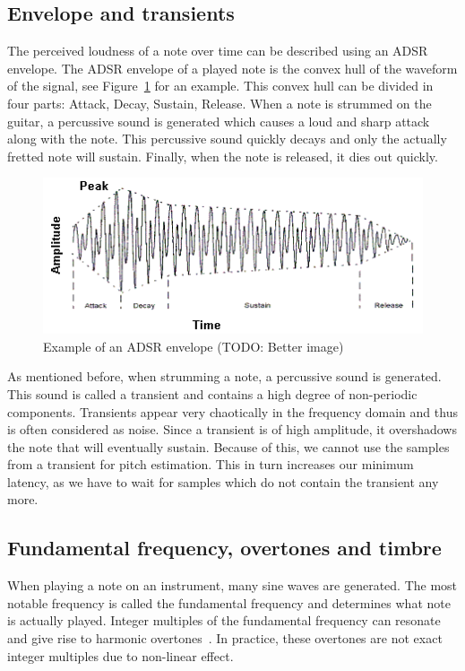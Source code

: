 \documentclass[10pt,twocolumn]{article}
\begin{document}
\subsection{Envelope and transients}
The perceived loudness of a note over time can be described using an ADSR envelope. The ADSR envelope of a played note is the convex hull of the waveform of the signal, see Figure~\ref{fig:adsr} for an example. This convex hull can be divided in four parts: Attack, Decay, Sustain, Release. When a note is strummed on the guitar, a percussive sound is generated which causes a loud and sharp attack along with the note. This percussive sound quickly decays and only the actually fretted note will sustain. Finally, when the note is released, it dies out quickly.
\begin{figure}[H]
    \centering
    \includegraphics[width=\linewidth]{fig/envelope.png}
    \caption{Example of an ADSR envelope (TODO: Better image)}
    \label{fig:adsr}
\end{figure}

As mentioned before, when strumming a note, a percussive sound is generated. This sound is called a transient and contains a high degree of non-periodic components. Transients appear very chaotically in the frequency domain and thus is often considered as noise. Since a transient is of high amplitude, it overshadows the note that will eventually sustain. Because of this, we cannot use the samples from a transient for pitch estimation. This in turn increases our minimum latency, as we have to wait for samples which do not contain the transient any more.

\subsection{Fundamental frequency, overtones and timbre}
When playing a note on an instrument, many sine waves are generated. The most notable frequency is called the fundamental frequency and determines what note is actually played. Integer multiples of the fundamental frequency can resonate and give rise to harmonic overtones~\cite{overtones}. In practice, these overtones are not exact integer multiples due to non-linear effect.
\end{document}
